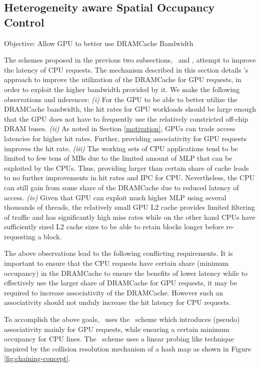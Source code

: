 \subsection{Heterogeneity aware Spatial Occupancy Control} \label{mechanism-chaining}
Objective: Allow GPU to better use DRAMCache Bandwidth
\par The schemes proposed in the previous two subsections, \prioname\ and \bypassname, attempt to improve the latency of CPU requests. The mechanism described in this section details \cachename's approach to improve the utilization of the DRAMCache for GPU requests, in order to exploit the higher bandwidth provided by it. We make the following observations and inferences: \textit{(i)} For the GPU to be able to better utilize the DRAMCache bandwidth, the hit rates for GPU workloads should be large enough that the GPU does not have to frequently use the relatively constricted off-chip DRAM buses. \textit{(ii)} As noted in Section \ref{motivation}, GPUs can trade access latencies for higher hit rates. Further, providing associativity for GPU requests improves the hit rate. \textit{(iii)} The working sets of CPU applications tend to be limited to few tens of MBs due to the limited amount of MLP that can be exploited by the CPUs. Thus, providing larger than certain share of cache leads to no further improvements in hit rates and IPC for CPU. Nevertheless, the CPU can still gain from some share of the DRAMCache due to reduced latency of access. \textit{(iv)} Given that GPU can exploit much higher MLP using several thousands of threads, the relatively small GPU L2 cache provides limited filtering of traffic and has significantly high miss rates while on the other hand CPUs have sufficiently sized L2 cache sizes to be able to retain blocks longer before re-requesting a block.
\par The above observations lead to the following conflicting requirements. It is important to ensure that the CPU requests have certain share (minimum occupancy) in the DRAMCache to ensure the benefits of lower latency while to effectively use the larger share of DRAMCache for GPU requests, it may be required to increase  associativity of the DRAMCache. However such an associativity should not unduly increase the hit latency for CPU requests. 
\par To accomplish the above goals, \cachename\ uses the \chaining\ scheme which introduces (pseudo) associativity mainly for GPU requests, while ensuring a certain minimum occupancy for CPU lines. The \chaining\ scheme uses a linear probing like technique inspired by the collision resolution mechanism of a hash map as shown in Figure \ref{fig:chaining-concept}.
